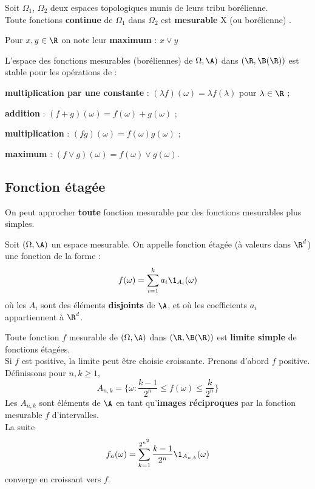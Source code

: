 \bp
Soit $\Omega_1$, $\Omega_2$ deux espaces topologiques munis de leurs tribu borélienne.\\
Toute fonctions \textbf{continue} de $\Omega_1$ dans $\Omega_2$ est \textbf{mesurable} X (ou borélienne) .
\ep
\bpf
\epf

\bigskip

\bn
Pour $x, y \in \R$ on note leur \textbf{maximum} : $x \lor y$
\en
    
\bp
L'espace des fonctions mesurables (boréliennes) de $\Omega, \A)$ dans $(\R, \B(\R))$ est stable pour les opérations de :
\ben 
    \item \textbf{multiplication par une constante} : $(\lambda f)(\omega) = \lambda f(\lambda)$ pour $\lambda \in \R$ ;
    \item \textbf{addition} : $(f+g)(\omega) = f(\omega) + g(\omega)$ ;
    \item \textbf{multiplication} : $(fg)(\omega) = f(\omega)g(\omega)$ ;
    \item \textbf{maximum} : $(f \lor g)(\omega) = f(\omega) \lor g(\omega)$.
\een
\ep
\bpf
\epf
    
    
\subsection{Fonction étagée}
    
On peut approcher \textbf{toute} fonction mesurable par des fonctions mesurables plus simples.

Soit $(\Omega, \A)$ un espace mesurable. On appelle fonction étagée (à valeurs dans $\R^d$) une fonction de la forme : $$f(\omega) = \sum_{i = 1}^k a_i \1_{A_i}(\omega)$$ où les $A_i$ sont des éléments \textbf{disjoints} de $\A$, et où les coefficients $a_i$ appartiennent à $\R^d$.
\ed
    
\bp
Toute fonction $f$ mesurable de $(\Omega, \A)$ dans $(\R,\B(\R))$ est \textbf{limite simple} de fonctions étagées. \\Si $f$ est positive, la limite peut être choisie croissante.
\ep
\bpf
Prenons d'abord $f$ positive. Définissons pour $n,k \geq 1$, $$A_{n,k} = \{ \omega : \frac{k-1}{2^n} \leq f(\omega) \leq \frac k{2^n} \}$$
Les $A_{n,k}$ sont éléments de $\A$ en tant qu'\textbf{images réciproques} par la fonction mesurable $f$ d'intervalles.\\
La suite $$f_n(\omega)  = \sum_{k = 1}^{2^{n^2}} \frac{k-1}{2^n} \1_{A_{n,k}}(\omega)$$
converge en croissant vers $f$.
\medskip

